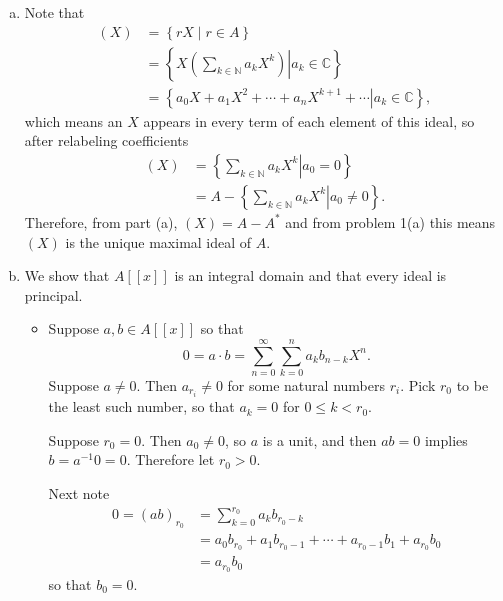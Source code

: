 \documentclass{article}
\begin{document}
\begin{Answer}
\begin{enumerate}[(a)]
{    }
    \item{
      Note that
      \begin{align*}
         (X)
      &= \left\{ r X \mid r \in A \right\} \\
      &= \left\{
           \left.
             X
             \left(
               \sum_{k \in \mathbb{N}} a_k X^k
             \right)
           \right|
             a_k \in \mathbb{C}
         \right\} \\
      &= \left\{
           \left.
             a_0 X + a_1 X^2 + \cdots + a_n X^{k+1} + \cdots
           \right|
             a_{k} \in \mathbb{C}
         \right\},
      \end{align*}
      which means an $X$ appears in every term of each element of this
      ideal, so after relabeling coefficients
      \begin{align*}
         (X)
      &= \left\{
           \left.
             \sum_{k \in \mathbb{N}} a_k X^k
           \right|
             a_0 = 0
         \right\} \\
      &= A -
         \left\{
           \left.
             \sum_{k \in \mathbb{N}} a_k X^k
           \right|
             a_0 \neq 0
         \right\}.
      \end{align*}
      Therefore, from part (a), $(X) = A - A^\ast$
      and from problem 1(a) this means $(X)$ is the unique maximal
      ideal of $A$.
    }
    \item{
      We show that $A[[x]]$ is an integral domain and that every ideal
      is principal.
      \begin{itemize}
        \item{
          Suppose $a, b \in A[[x]]$ so that
          $$
          0 = a \cdot b = \sum_{n=0}^\infty \sum_{k=0}^n a_k b_{n-k} X^n.
          $$
          Suppose $a \neq 0$. Then $a_{r_i} \neq 0$ for some
          natural numbers $r_i$. Pick $r_0$ to be the least such number,
          so that $a_{k} = 0$ for $0 \leq k < r_0$.

          Suppose $r_0 = 0$. Then $a_0 \neq 0$, so $a$ is a unit, and
          then $ab = 0$ implies $b = a^{-1} 0 = 0$. Therefore let $r_0
          > 0$.

          Next note
          \begin{align*}
           0 = (ab)_{r_0}
            &= \sum_{k=0}^{r_0} a_k b_{r_0 - k} \\
            &= a_0 b_{r_0}
             + a_1 b_{r_0 - 1}
             + \cdots
             + a_{r_0 - 1} b_1
             + a_{r_0} b_0 \\
            &= a_{r_0} b_0
          \end{align*}
          so that $b_0 = 0$.

}
\end{itemize}}
\end{enumerate}
\end{Answer}
\end{document}
